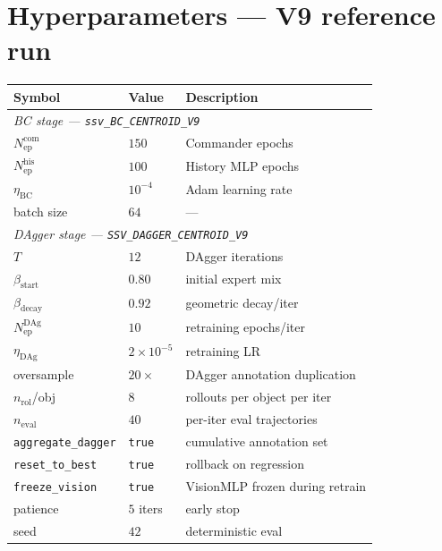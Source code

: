 \documentclass[11pt, a4paper]{article}
\begin{document}
\section{Hyperparameters --- V9 reference run}

\begin{center}
\begin{tabular}{lll}
\toprule
\textbf{Symbol} & \textbf{Value} & \textbf{Description} \\
\midrule
\multicolumn{3}{l}{\textit{BC stage --- \texttt{ssv\_BC\_CENTROID\_V9}}} \\
$N_{\text{ep}}^{\text{com}}$ & $150$        & Commander epochs \\
$N_{\text{ep}}^{\text{his}}$ & $100$        & History MLP epochs \\
$\eta_{\text{BC}}$           & $10^{-4}$    & Adam learning rate \\
batch size                   & $64$         & --- \\
\midrule
\multicolumn{3}{l}{\textit{DAgger stage --- \texttt{SSV\_DAGGER\_CENTROID\_V9}}} \\
$T$                          & $12$         & DAgger iterations \\
$\beta_{\text{start}}$       & $0.80$       & initial expert mix \\
$\beta_{\text{decay}}$       & $0.92$       & geometric decay/iter \\
$N_{\text{ep}}^{\text{DAg}}$ & $10$         & retraining epochs/iter \\
$\eta_{\text{DAg}}$          & $2\times 10^{-5}$ & retraining LR \\
oversample                   & $20\times$   & DAgger annotation duplication \\
$n_{\text{rol}}$/obj         & $8$          & rollouts per object per iter \\
$n_{\text{eval}}$            & $40$         & per-iter eval trajectories \\
\texttt{aggregate\_dagger}   & \texttt{true} & cumulative annotation set \\
\texttt{reset\_to\_best}     & \texttt{true} & rollback on regression \\
\texttt{freeze\_vision}      & \texttt{true} & VisionMLP frozen during retrain \\
patience                     & $5$ iters    & early stop \\
seed                         & $42$         & deterministic eval \\
\bottomrule
\end{tabular}
\end{center}
\end{document}
